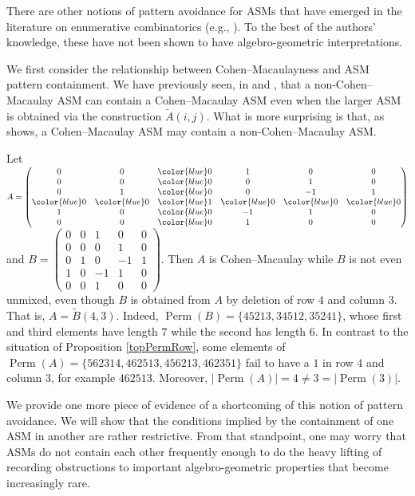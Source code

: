 \documentclass[12 pt]{amsart}
\DeclareMathOperator{\Perm}{Perm}
\theoremstyle{plain}
\newenvironment{example}
  {\pushQED{\qed}\renewcommand{\qedsymbol}{$\diamondsuit$}\examplex}
  {\popQED\endexamplex}
\theoremstyle{definition}
\theoremstyle{remark}
\begin{document}
{There are other notions of pattern avoidance for ASMs that have emerged in the literature on enumerative combinatorics (e.g., \cite{JL07, ACG11, BSS25}).  To the best of the authors' knowledge, these have not been shown to have algebro-geometric interpretations.  

We first consider the relationship between Cohen--Macaulayness and ASM pattern containment.  We have previously seen, in  and , that a non-Cohen--Macaulay ASM can contain a Cohen--Macaulay ASM even when the larger ASM is obtained via the construction $\widetilde{A}(i,j)$.  What is more surprising is that, as  shows, a Cohen--Macaulay ASM may contain a non-Cohen--Macaulay ASM.

\begin{example}\label{ex:CM-contains-non}
    Let $A = \begin{pmatrix} 
    0 & 0 & {\color{blue}0} & 1 & 0 & 0\\
    0 & 0 & {\color{blue}0} & 0 & 1 & 0\\
    0 & 1 & {\color{blue}0} & 0 & -1 & 1\\
    {\color{blue}0} & {\color{blue}0} & {\color{blue}1} & {\color{blue}0} & {\color{blue}0} & {\color{blue}0}\\
    1 & 0 & {\color{blue}0} & -1 & 1 & 0\\
    0 & 0 & {\color{blue}0} & 1 & 0 & 0
   \end{pmatrix} $ and $B = \begin{pmatrix} 
    0 & 0  & 1 & 0 & 0\\
    0 & 0  & 0 & 1 & 0\\
    0 & 1  & 0 & -1 & 1\\
    1 & 0  & -1 & 1 & 0\\
    0 & 0  & 1 & 0 & 0
   \end{pmatrix} $.  Then $A$ is Cohen--Macaulay while $B$ is not even unmixed, even though $B$ is obtained from $A$ by deletion of row $4$ and column $3$.  That is, $A = \widetilde{B}(4,3)$.  Indeed, $\Perm(B) = \{45213, 34512, 35241\}$, whose first and third elements have length $7$ while the second has length $6$. In contrast to the situation of Proposition \ref{topPermRow}, some elements of $\Perm(A) = \{562314,462513,456213,462351\}$ fail to have a $1$ in row $4$ and column $3$, for example $462513$.  Moreover, $|\Perm(A)| = 4 \neq 3 = |\Perm(3)|$.
\end{example}

We provide one more piece of evidence of a shortcoming of this notion of pattern avoidance.  We will show that the conditions implied by the containment of one ASM in another are rather restrictive.  From that standpoint, one may worry that ASMs do not contain each other frequently enough to do the heavy lifting of recording obstructions to important algebro-geometric properties that become increasingly rare.

}
\end{document}
